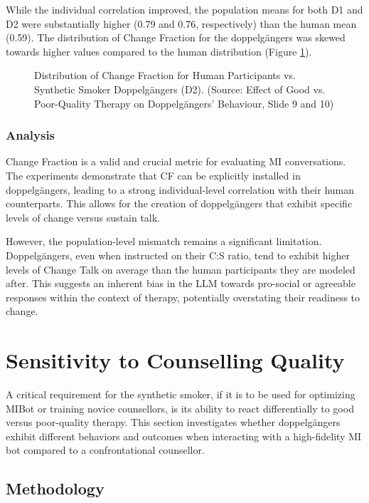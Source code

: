 While the individual correlation improved, the population means for both D1 and D2 were substantially higher (0.79 and 0.76, respectively) than the human mean (0.59). The distribution of Change Fraction for the doppelgängers was skewed towards higher values compared to the human distribution (Figure \ref{fig:cf_distribution}).

\begin{figure}[h]
    \centering
    \caption{Distribution of Change Fraction for Human Participants vs. Synthetic Smoker Doppelgängers (D2). (Source: Effect of Good vs. Poor-Quality Therapy on Doppelgängers’ Behaviour, Slide 9 and 10)}
    \label{fig:cf_distribution}
\end{figure}

\subsubsection{Analysis}

Change Fraction is a valid and crucial metric for evaluating MI conversations. The experiments demonstrate that CF can be explicitly installed in doppelgängers, leading to a strong individual-level correlation with their human counterparts. This allows for the creation of doppelgängers that exhibit specific levels of change versus sustain talk.

However, the population-level mismatch remains a significant limitation. Doppelgängers, even when instructed on their C:S ratio, tend to exhibit higher levels of Change Talk on average than the human participants they are modeled after. This suggests an inherent bias in the LLM towards pro-social or agreeable responses within the context of therapy, potentially overstating their readiness to change.

\section{Sensitivity to Counselling Quality}

A critical requirement for the synthetic smoker, if it is to be used for optimizing MIBot or training novice counsellors, is its ability to react differentially to good versus poor-quality therapy. This section investigates whether doppelgängers exhibit different behaviors and outcomes when interacting with a high-fidelity MI bot compared to a confrontational counsellor.

\subsection{Methodology}

